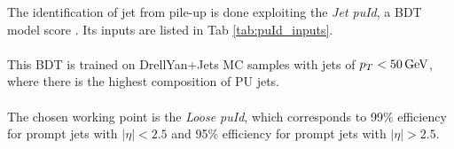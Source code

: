 \begin{minipage}{\linewidth}
    \begin{minipage}{0.4\linewidth}
        The identification of jet from pile-up is done exploiting the \emph{Jet puId},
        a BDT model score \cite{CMSCollaboration2020PileupData}. Its inputs are listed in Tab \ref{tab:puId_inputs}.\\
        \\
        This BDT is trained on DrellYan+Jets MC samples with jets of $p_T<50{\,\text{Ge\hspace{-.08em}V}}$, where there is the highest composition of PU jets.\\
        \\
        The chosen working point is the \emph{Loose puId}, which corresponds to 99\%  efficiency for prompt jets with $|\eta| < 2.5$ and 95\% efficiency for prompt jets with $|\eta| > 2.5$.
    \end{minipage}
    \hfill
    \begin{minipage}{0.55\linewidth}
        \vspace{-0.8cm}
    

\end{minipage}
\end{minipage}
